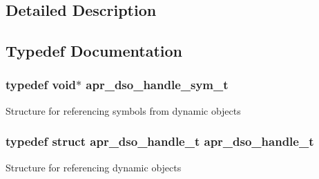 \subsection{Detailed Description}


\subsection{Typedef Documentation}
\hypertarget{group__apr__dso_gaf1aa0a039e8003586cfdfbc4ac57e775}{
\subsubsection[{apr\-\_\-dso\-\_\-handle\-\_\-sym\-\_\-t}]{\setlength{\rightskip}{0pt plus 5cm}typedef void$\ast$ {\bf apr\-\_\-dso\-\_\-handle\-\_\-sym\-\_\-t}}}\label{group__apr__dso_gaf1aa0a039e8003586cfdfbc4ac57e775}
Structure for referencing symbols from dynamic objects \hypertarget{group__apr__dso_ga85e7e28490d026aeed78bd78e9933472}{
\subsubsection[{apr\-\_\-dso\-\_\-handle\-\_\-t}]{\setlength{\rightskip}{0pt plus 5cm}typedef struct {\bf apr\-\_\-dso\-\_\-handle\-\_\-t} {\bf apr\-\_\-dso\-\_\-handle\-\_\-t}}}\label{group__apr__dso_ga85e7e28490d026aeed78bd78e9933472}
Structure for referencing dynamic objects 

